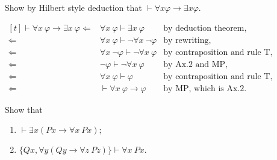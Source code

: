 \begin{exercise}
  Show by Hilbert style deduction that $\vdash\forall x \varphi\to\exists x \varphi$.
\end{exercise}

$\begin{aligned}[t]
    \vdash\forall x\ \varphi\rightarrow\exists x\ \varphi
    \Leftarrow & \forall x\ \varphi\vdash \exists x\ \varphi           & \text{by deduction theorem,}         \\
    \Leftarrow & \forall x\ \varphi\vdash \neg\forall x\ \neg \varphi  & \text{by rewriting,}                 \\
    \Leftarrow & \forall x\ \neg \varphi \vdash \neg\forall x\ \varphi & \text{by contraposition and rule T,} \\
    \Leftarrow & \neg \varphi\vdash \neg\forall x\ \varphi             & \text{by Ax.2 and MP,}               \\
    \Leftarrow & \forall x\ \varphi\vdash \varphi                      & \text{by contraposition and rule T,} \\
    \Leftarrow & \vdash\forall x\ \varphi\to \varphi                   & \text{by MP, which is Ax.2.}
  \end{aligned}$

\setcounter{exercise}{6}

\begin{exercise}
  Show that
  \begin{enumerate}[label=(\alph*)]
    \item $\vdash\exists x(Px\rightarrow\forall x\ Px);$
    \item $\{Qx, \forall y(Qy\rightarrow\forall z\ Pz)\}\vdash\forall x\ Px.$\qedhere
  \end{enumerate}
\end{exercise}

